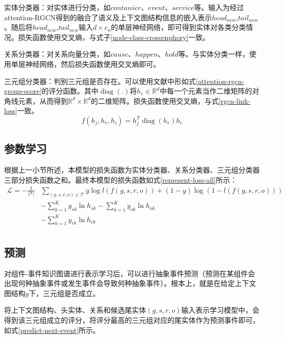 实体分类器：对实体进行分类，如$contanier$、$event$、$service$等。输入为经过attention-RGCN得到的融合了语义及上下文图结构信息的嵌入表示$head_{new}$,$tail_{new}$。随后将$head_{new}$,$tail_{new}$输入$d \times c_{n}$的单层神经网络，即可得到实体对各类分类情况。损失函数使用交叉熵，与式子\ref{node-class-crossenphory}一致。

关系分类器：对关系向量分类，如$cause$、$happen$、$hold$等。与实体分类一样，使用单层神经网络，然后损失函数使用交叉熵即可。

三元组分类器：判别三元组是否存在。可以使用文献\parencite{trouillon2016complex}中形如式\ref{attention-rgcn-group-score}的评分函数。其中$\operatorname{diag}\left(.\right)$将$h_r\in\mathbb{R}^{d}$中每一个元素当作二维矩阵的对角线元素，从而得到$\mathbb{R}^{d}\times \mathbb{R}^{d}$的二维矩阵。损失函数使用交叉熵，与式\ref{rgcn-link-loss}一致。
\begin{equation}
    f(h_{j}, h_{r}, h_{i})=h_{j}^{T} \operatorname{diag}\left(h_{r}\right) h_{i}
    \label{attention-rgcn-group-score}
\end{equation}

\subsection{参数学习}\label{representation-paras-learn}
根据上一小节所述，本模型的损失函数为实体分类器、关系分类器、三元组分类器三部分损失函数之和。最终本模型的损失函数如式\ref{represent-loss-all}所示：
\begin{equation}
    \begin{aligned}
    \mathcal{L}=-\frac{1}{|\mathcal{T}|} & \sum_{(g, s, r, o) \in \mathcal{T}} y \log l(f(g, s, r, o))+(1-y) \log (1-l(f(g, s, r, o)))\\
    &- \sum_{k=1}^{K} y_{s k} \ln h_{s k} - \sum_{k=1}^{K} y_{o k} \ln h_{o k}\\
    &- \sum_{k=1}^{K} y_{r k} \ln h_{r k}\\
    \end{aligned}
    \label{represent-loss-all}
\end{equation}

\subsection{预测}
对组件-事件知识图谱进行表示学习后，可以进行抽象事件预测（预测在某组件会出现何种抽象事件或发生事件会导致何种抽象事件）。根本上，就是在给定上下文图结构$g$下，三元组是否成立。

将上下文图结构、头实体、关系和候选尾实体$(g, s, r, o)$输入表示学习模型中，会得到该三元组成立的评分，将评分最高的三元组对应的尾实体作为预测事件即可，如式\ref{predict-next-event}所示。


